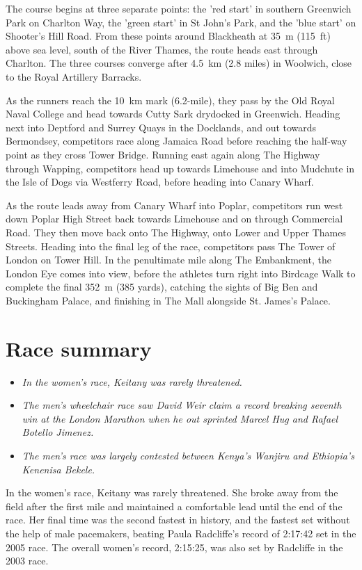 The course begins at three separate points: the 'red start' in southern
Greenwich Park on Charlton Way, the 'green start' in St John's Park, and
the 'blue start' on Shooter's Hill Road. From these points around
Blackheath at 35~m (115~ft) above sea level, south of the River Thames,
the route heads east through Charlton. The three courses converge after
4.5~km (2.8 miles) in Woolwich, close to the Royal Artillery Barracks.

As the runners reach the 10~km mark (6.2-mile), they pass by the Old
Royal Naval College and head towards Cutty Sark drydocked in Greenwich.
Heading next into Deptford and Surrey Quays in the Docklands, and out
towards Bermondsey, competitors race along Jamaica Road before reaching
the half-way point as they cross Tower Bridge. Running east again along
The Highway through Wapping, competitors head up towards Limehouse and
into Mudchute in the Isle of Dogs via Westferry Road, before heading
into Canary Wharf.

As the route leads away from Canary Wharf into Poplar, competitors run
west down Poplar High Street back towards Limehouse and on through
Commercial Road. They then move back onto The Highway, onto Lower and
Upper Thames Streets. Heading into the final leg of the race,
competitors pass The Tower of London on Tower Hill. In the penultimate
mile along The Embankment, the London Eye comes into view, before the
athletes turn right into Birdcage Walk to complete the final 352~m (385
yards), catching the sights of Big Ben and Buckingham Palace, and
finishing in The Mall alongside St. James's Palace.

\section{Race summary}\label{race-summary}

\begin{itemize}
\item
  \emph{In the women's race, Keitany was rarely threatened.}
\item
  \emph{The men's wheelchair race saw David Weir claim a record breaking
  seventh win at the London Marathon when he out sprinted Marcel Hug and
  Rafael Botello Jimenez.}
\item
  \emph{The men's race was largely contested between Kenya's Wanjiru and
  Ethiopia's Kenenisa Bekele.}
\end{itemize}

In the women's race, Keitany was rarely threatened. She broke away from
the field after the first mile and maintained a comfortable lead until
the end of the race. Her final time was the second fastest in history,
and the fastest set without the help of male pacemakers, beating Paula
Radcliffe's record of 2:17:42 set in the 2005 race. The overall women's
record, 2:15:25, was also set by Radcliffe in the 2003 race.

